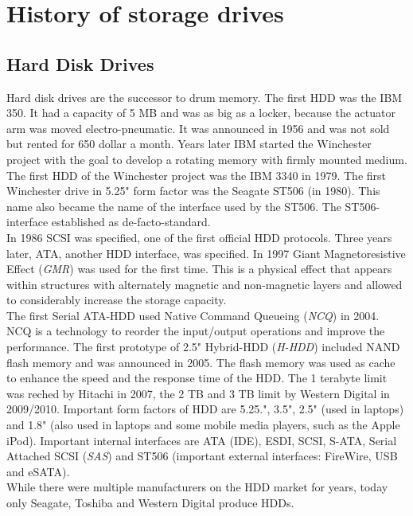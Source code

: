 \documentclass{acm_proc_article-sp}
\begin{document}
\section{History of storage drives}

\subsection{Hard Disk Drives}
Hard disk drives are the successor to drum memory. The first HDD was the IBM 350. It had a capacity of 5 MB and was as big as a locker, because the actuator arm was moved electro-pneumatic. It was announced in 1956 and was not sold but rented for 650 dollar a month. Years later IBM started the Winchester project with the goal to develop a rotating memory with firmly mounted medium. The first HDD of the Winchester project was the IBM 3340 in 1979. The first Winchester drive in 5.25" form factor was the Seagate ST506 (in 1980). This name also became the name of the interface used by the ST506. The ST506-interface established as de-facto-standard.
\\
In 1986 SCSI was specified, one of the first official HDD protocols. Three years later, ATA, another HDD interface, was specified. In 1997 Giant Magnetoresistive Effect (\emph{GMR}) was used for the first time. This is a physical effect that appears within structures with alternately magnetic and non-magnetic layers and allowed to considerably increase the storage capacity.
\\
The first Serial ATA-HDD used Native Command Queueing (\emph{NCQ}) in 2004. NCQ is a technology to reorder the input/output operations and improve the performance. The first prototype of 2.5" Hybrid-HDD (\emph{H-HDD}) included NAND flash memory and was announced in 2005. The flash memory was used as cache to enhance the speed and the response time of the HDD. The 1 terabyte limit was reched by Hitachi in 2007, the 2 TB and 3 TB limit by Western Digital in 2009/2010. Important form factors of HDD are 5.25.", 3.5", 2.5" (used in laptops) and 1.8" (also used in laptops and some mobile media players, such as the Apple iPod). Important internal interfaces are ATA (IDE), ESDI, SCSI, S-ATA, Serial Attached SCSI (\emph{SAS}) and ST506 (important external interfaces: FireWire, USB and eSATA).
\\
While  there were multiple manufacturers on the HDD market for years, today only Seagate, Toshiba and Western Digital produce HDDs.
\end{document}
